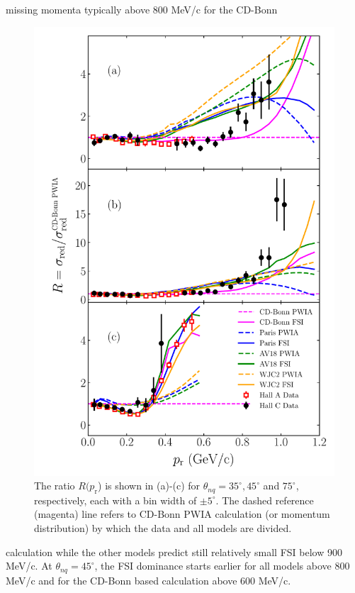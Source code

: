 missing momenta typically above 800 MeV/c for the CD-Bonn
\begin{figure}[!t]
\includegraphics[scale=0.5]{./prl_plots/PRL_plot2_WJC2.pdf}
\caption{The ratio $R(p_{\mathrm{r}}$) is shown in (a)-(c) for $\theta_{nq}=35^{\circ}, 45^{\circ}$ and $75^{\circ}$, respectively, each with a bin width of $\pm 5^{\circ}$.
The dashed reference (magenta) line refers to CD-Bonn PWIA calculation (or momentum distribution) by which the data and all models are divided.}
\label{fig:fig2}
\end{figure}
calculation while the other models predict still relatively small FSI below 900 MeV/c.
At $\theta_{nq}=45^{\circ}$, the FSI dominance starts earlier for all models above 800 MeV/c and for the CD-Bonn based calculation above 600 MeV/c. \\
